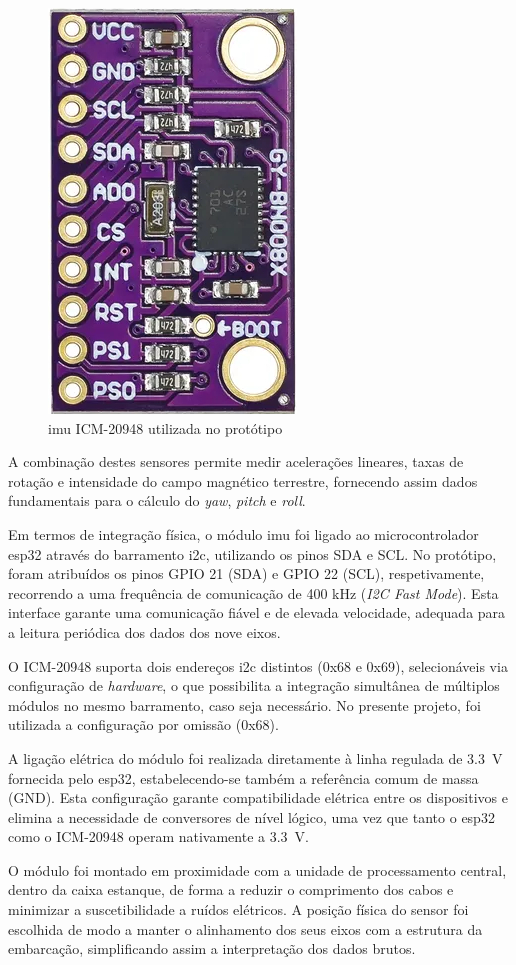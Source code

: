 \begin{figure}[H]
    \centering
    \includegraphics[width=0.25\linewidth]{figuras/imu-icm.jpg}
    \caption{\gls{imu} ICM-20948 utilizada no protótipo}
    \label{fig:imu}
\end{figure}

A combinação destes sensores permite medir acelerações lineares, taxas de rotação e intensidade do campo magnético terrestre, fornecendo assim dados fundamentais para o cálculo do \emph{yaw},  \emph{pitch} e \emph{roll}.

Em termos de integração física, o módulo \gls{imu} foi ligado ao microcontrolador \gls{esp32} através do barramento \gls{i2c}, utilizando os pinos SDA e SCL. No protótipo, foram atribuídos os pinos GPIO 21 (SDA) e GPIO 22 (SCL), respetivamente, recorrendo a uma frequência de comunicação de 400 kHz (\emph{I2C Fast Mode}). Esta interface garante uma comunicação fiável e de elevada velocidade, adequada para a leitura periódica dos dados dos nove eixos.

O ICM-20948 suporta dois endereços \gls{i2c} distintos (0x68 e 0x69), selecionáveis via configuração de \emph{hardware}, o que possibilita a integração simultânea de múltiplos módulos no mesmo barramento, caso seja necessário. No presente projeto, foi utilizada a configuração por omissão (0x68).  

A ligação elétrica do módulo foi realizada diretamente à linha regulada de 3.3~V fornecida pelo \gls{esp32}, estabelecendo-se também a referência comum de massa (GND). Esta configuração garante compatibilidade elétrica entre os dispositivos e elimina a necessidade de conversores de nível lógico, uma vez que tanto o \gls{esp32} como o ICM-20948 operam nativamente a 3.3~V.

O módulo foi montado em proximidade com a unidade de processamento central, dentro da caixa estanque, de forma a reduzir o comprimento dos cabos e minimizar a suscetibilidade a ruídos elétricos. A posição física do sensor foi escolhida de modo a manter o alinhamento dos seus eixos com a estrutura da embarcação, simplificando assim a interpretação dos dados brutos.  

